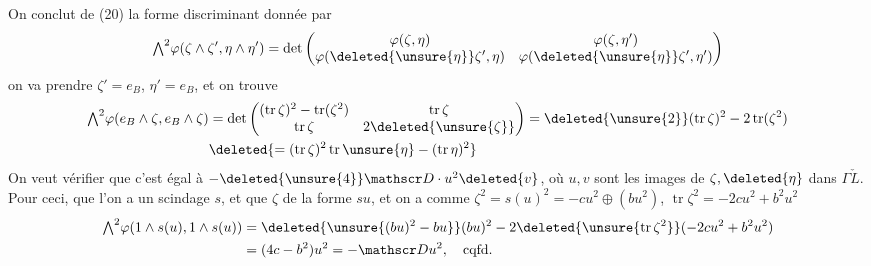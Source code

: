 On conclut de (20)  la forme discriminant
 donnée par
\[
{\textstyle\bigwedge^2}\varphi(\zeta\wedge\zeta',\eta\wedge\eta')=\det
\begin{pmatrix}\varphi(\zeta,\eta)&\varphi(\zeta,\eta')\\
\varphi(\deleted{\unsure{\eta}}\zeta',\eta)&\varphi(\deleted{\unsure{\eta}}\zeta',\eta')\end{pmatrix}
\]
on va prendre $\zeta'=e_B$, $\eta'=e_B$, \inserted{$\zeta=\eta$} et on trouve
\[
\begin{aligned}
{\textstyle\bigwedge^2}\varphi( e_B\wedge\zeta,e_B\wedge\zeta)
 &=\det\begin{pmatrix}(\operatorname{tr}\zeta)^2-\operatorname{tr}(\zeta^2)&\operatorname{tr}\zeta\\
 \operatorname{tr}\zeta&2\deleted{\unsure{\zeta}}\end{pmatrix}
 =\deleted{\unsure{2}}(\operatorname{tr}\zeta)^2-2\operatorname{tr}(\zeta^2)\\
 &\deleted{=(\operatorname{tr}\zeta)^2\operatorname{tr}\unsure{\eta}-(\operatorname{tr}\eta)^2}
\end{aligned}
\]
On veut vérifier que \unsure{$-$} c'est égal à $-\deleted{\unsure{4}}\mathscr D\cdot u^2\deleted{v}$, où
$u,v$ sont les images de $\zeta,\deleted{\eta}$ dans $\Gamma\check L$. Pour ceci,
 que l'on a un scindage $s$, et que
$\zeta$   de la forme $su$,  et on a
 comme $\zeta^2=s(u)^2=-cu^2\oplus(bu^2)$, $\operatorname{tr}\zeta^2=-2cu^2+b^2u^2$
\[
\begin{aligned}
{\textstyle\bigwedge^2}\varphi(1\wedge s(u),1\wedge s(u))&=\deleted{\unsure{(bu)^2-bu}}(bu)^2-2\deleted{\unsure{\operatorname{tr}\zeta^2}}(-2cu^2+b^2u^2)\\
&=(4c-b^2)u^2=-\mathscr D u^2,\quad \text{cqfd.}
\end{aligned}
\]


